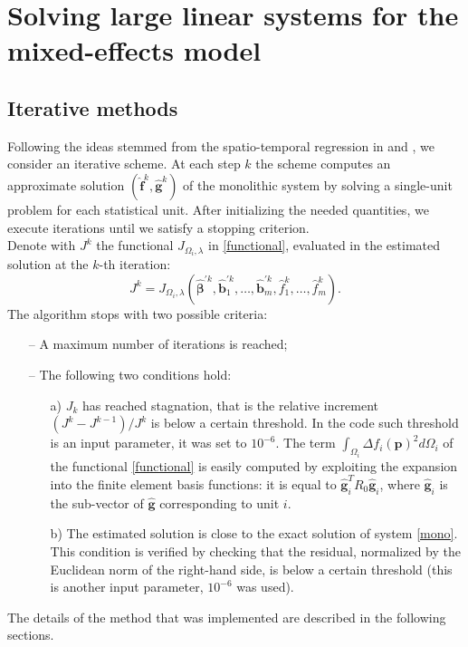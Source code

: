 
\chapter{Solving large linear systems for the mixed-effects model}
\label{ch:chapter_name}
\section{Iterative methods}

Following the ideas stemmed from the spatio-temporal regression in
\citeauthor{pollini} \cite{pollini} and \citeauthor{massardi} \cite{massardi},
we consider an iterative scheme. At each step $k$ the scheme computes an
approximate solution $(\hat{\bm{f}}^{k},\hat{\bm{g}}^{k})$ of the monolithic
system by solving a single-unit problem for each statistical unit. After
initializing the needed quantities, we execute iterations until we satisfy a
stopping criterion.\\ Denote with $J^k$ the functional $J_{\Omega_i, \lambda}$
in \ref{functional}, evaluated in the estimated solution at the $k$-th
iteration:
\begin{equation}
	J^k = J_{\Omega_i, \lambda}\left(
	\hat{\bm{\beta}}^{\prime k}, \hat{\bm{b}}^{\prime k}_1, \dots,
	\hat{\bm{b}}^{\prime k}_m, \hat{f}_1^k, \dots, \hat{f}_m^k \right).
\end{equation}
The algorithm stops with two possible criteria:
\begin{itemize}
	\item[--]A maximum number of iterations is reached;
	\item[--] The following two
		conditions hold:
		\begin{enumerate}
			\item[a)] $J_k$ has reached stagnation, that is the relative increment $\left( J^k - J^{k-1}\right) / J^k$
				is below a certain threshold. In the code such threshold is an input parameter,
				it was set to $10^{-6}$. The term $ \int_{\Omega_i} \Delta f_i
					\left(\bm{p}\right)^2 d\Omega_i $ of the functional \ref{functional} is easily
				computed by exploiting the expansion into the finite element basis functions:
				it is equal to $\hat{\bm{g}}_i^T R_0 \hat{\bm{g}}_i$, where $\hat{\bm{g}}_i $
				is the sub-vector of $\hat{\bm{g}}$ corresponding to unit $i$.
			\item[b)] The estimated solution is close to the exact solution of system
				\ref{mono}. This condition is verified by checking that the residual,
				normalized by the Euclidean norm of the right-hand side, is below a certain
				threshold (this is another input parameter, $10^{-6}$ was used).
		\end{enumerate}
\end{itemize}
The details of the method that was implemented are described in the
following sections.

